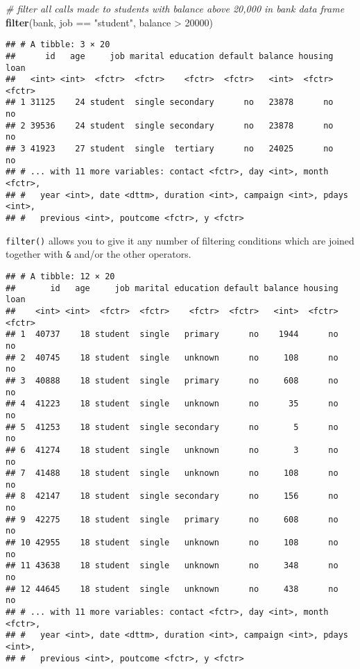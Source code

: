 \documentclass[]{book}
\newenvironment{Shaded}{\begin{snugshade}}{\end{snugshade}}
\newcommand{\KeywordTok}[1]{\textcolor[rgb]{0.13,0.29,0.53}{\textbf{{#1}}}}
\newcommand{\DecValTok}[1]{\textcolor[rgb]{0.00,0.00,0.81}{{#1}}}
\newcommand{\StringTok}[1]{\textcolor[rgb]{0.31,0.60,0.02}{{#1}}}
\newcommand{\CommentTok}[1]{\textcolor[rgb]{0.56,0.35,0.01}{\textit{{#1}}}}
\newcommand{\NormalTok}[1]{{#1}}
\begin{document}
\begin{Shaded}
\begin{Highlighting}[]
\CommentTok{# filter all calls made to students with balance above 20,000 in bank data frame}
\KeywordTok{filter}\NormalTok{(bank, job ==}\StringTok{ "student"}\NormalTok{, balance >}\StringTok{ }\DecValTok{20000}\NormalTok{)}
\end{Highlighting}
\end{Shaded}

\begin{verbatim}
## # A tibble: 3 × 20
##      id   age     job marital education default balance housing   loan
##   <int> <int>  <fctr>  <fctr>    <fctr>  <fctr>   <int>  <fctr> <fctr>
## 1 31125    24 student  single secondary      no   23878      no     no
## 2 39536    24 student  single secondary      no   23878      no     no
## 3 41923    27 student  single  tertiary      no   24025      no     no
## # ... with 11 more variables: contact <fctr>, day <int>, month <fctr>,
## #   year <int>, date <dttm>, duration <int>, campaign <int>, pdays <int>,
## #   previous <int>, poutcome <fctr>, y <fctr>
\end{verbatim}

\texttt{filter()} allows you to give it any number of filtering
conditions which are joined together with \texttt{\&} and/or the other
operators.

\begin{Shaded}
\end{Shaded}

\begin{verbatim}
## # A tibble: 12 × 20
##       id   age     job marital education default balance housing   loan
##    <int> <int>  <fctr>  <fctr>    <fctr>  <fctr>   <int>  <fctr> <fctr>
## 1  40737    18 student  single   primary      no    1944      no     no
## 2  40745    18 student  single   unknown      no     108      no     no
## 3  40888    18 student  single   primary      no     608      no     no
## 4  41223    18 student  single   unknown      no      35      no     no
## 5  41253    18 student  single secondary      no       5      no     no
## 6  41274    18 student  single   unknown      no       3      no     no
## 7  41488    18 student  single   unknown      no     108      no     no
## 8  42147    18 student  single secondary      no     156      no     no
## 9  42275    18 student  single   primary      no     608      no     no
## 10 42955    18 student  single   unknown      no     108      no     no
## 11 43638    18 student  single   unknown      no     348      no     no
## 12 44645    18 student  single   unknown      no     438      no     no
## # ... with 11 more variables: contact <fctr>, day <int>, month <fctr>,
## #   year <int>, date <dttm>, duration <int>, campaign <int>, pdays <int>,
## #   previous <int>, poutcome <fctr>, y <fctr>
\end{verbatim}
\end{document}
